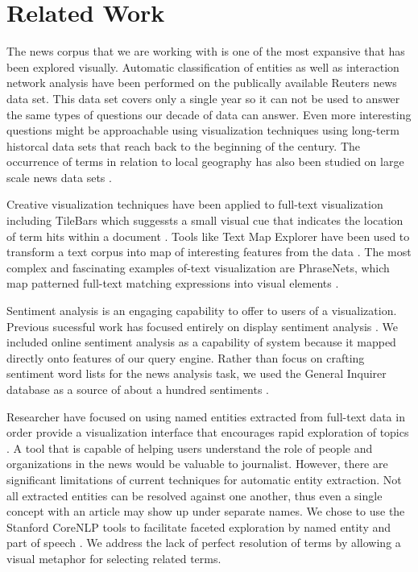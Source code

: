 \section{Related Work}



\cite{paulovich2006text}

The news corpus that we are working with is one of the most expansive that has been explored visually.  Automatic classification of entities \cite{wermter2002selforganizing} as well as interaction network analysis \cite{johnson2004network} have been performed on the publically available Reuters news data set.  This data set covers only a single year so it can not be used to answer the same types of questions our decade of data can answer.  Even more interesting questions might be approachable using visualization techniques using long-term historcal data sets that reach back to the beginning of the century.  The occurrence of terms in relation to local geography has also been studied on large scale news data sets \cite{mehler2006spatial}.

Creative visualization techniques have been applied to full-text visualization including TileBars which suggessts a small visual cue that indicates the location of term hits within a document \cite{hearst1995tilebars}.  Tools like Text Map Explorer have been used to transform a text corpus into map of interesting features from the data \cite{paulovich2006text}.  The most complex and fascinating examples of-text visualization are PhraseNets, which map patterned full-text matching expressions into visual elements \cite{phrasenets}.

Sentiment analysis is an engaging capability to offer to users of a visualization.  Previous sucessful work has focused entirely on display sentiment analysis \cite{wanner2009visual}.  We included online sentiment analysis as a capability of system because it mapped directly onto features of our query engine.  Rather than focus on crafting sentiment word lists for the news analysis task, we used the General Inquirer database as a source of about a hundred sentiments \cite{generalinquirer}.

Researcher have focused on using named entities extracted from full-text data in order provide a visualization interface that encourages rapid exploration of topics \cite{grobelnik2004visualization}.  A tool that is capable of helping users understand the role of people and organizations in the news would be valuable to journalist.  However, there are significant limitations of current techniques for automatic entity extraction.  Not all extracted entities can be resolved against one another, thus even a single concept with an article may show up under separate names.  We chose to use the Stanford CoreNLP tools to facilitate faceted exploration by named entity and part of speech \cite{finkel2005incorporating,toutanova2003feature}.  We address the lack of perfect resolution of terms by allowing a visual metaphor for selecting related terms.

